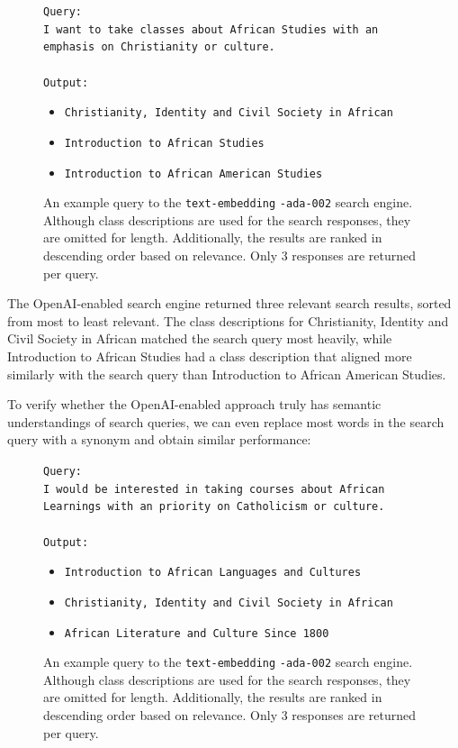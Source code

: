 \documentclass[
	a4paper, %
	10pt, %
	unnumberedsections, %
	twoside, %
]{LTJournalArticle}
\begin{document}
\begin{figure}[h]
	\begin{center}
		\texttt{Query:} \\
		\texttt{I want to take classes about African Studies with an emphasis on Christianity or culture.} \\
		\texttt{}\\
		\texttt{Output:} 
		\begin{itemize}
			\item \texttt{Christianity, Identity and Civil Society in African}
			\item \texttt{Introduction to African Studies}
			\item \texttt{Introduction to African American Studies}
		\end{itemize}		
	\end{center}

	\caption{An example query to the \texttt{text-embedding} \texttt{-ada-002} search engine. Although class descriptions are used for the search responses, they are omitted for length. Additionally, the results are ranked in descending order based on relevance. Only 3 responses are returned per query.}
	\label{fig:ex1}
\end{figure}


The OpenAI-enabled search engine returned three relevant search results, sorted from most to least relevant. The class descriptions for Christianity, Identity and Civil Society in African matched the search query most heavily, while Introduction to African Studies had a class description that aligned more similarly with the search query than Introduction to African American Studies.  

To verify whether the OpenAI-enabled approach truly has semantic understandings of search queries, we can even replace most words in the search query with a synonym and obtain similar performance: 

\begin{figure}[h]
	\begin{center}
		\texttt{Query:} \\
		\texttt{I would be interested in taking courses about African Learnings with an priority on Catholicism or culture.} \\
		\texttt{}\\
		\texttt{Output:} 
		\begin{itemize}
			\item \texttt{Introduction to African Languages and Cultures}
			\item \texttt{Christianity, Identity and Civil Society in African}
			\item \texttt{African Literature and Culture Since 1800}
		\end{itemize}		
	\end{center}

	\caption{An example query to the \texttt{text-embedding} \texttt{-ada-002} search engine. Although class descriptions are used for the search responses, they are omitted for length. Additionally, the results are ranked in descending order based on relevance. Only 3 responses are returned per query.}
\end{figure}
\end{document}
